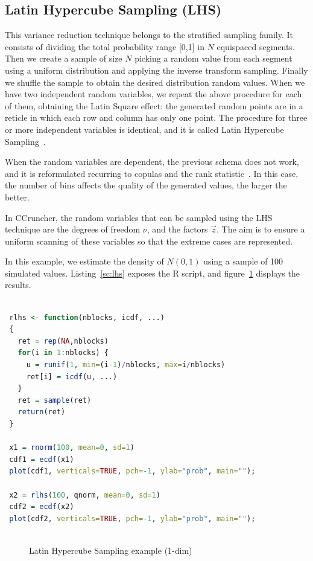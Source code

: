 \documentclass[11pt,fleqn]{book} %
\begin{document}
\subsection{Latin Hypercube Sampling (LHS)}
This variance reduction technique 
belongs to the stratified sampling family. It consists of dividing the total 
probability range [0,1] in $N$ equispaced segments. Then we create a 
sample of size $N$ picking a random value from each segment using a uniform 
distribution and applying the inverse transform sampling. Finally we shuffle 
the sample to obtain the desired distribution random values. When we have 
two independent random variables, we repeat the above procedure for each of 
them, obtaining the Latin Square effect: the generated random points are in
a reticle in which each row and column has only one point. The procedure for
three or more independent variables is identical, and it is called Latin 
Hypercube Sampling~\cite{glasserman:1997}.

When the random variables are dependent, the previous schema does not work, 
and it is reformulated recurring to copulas and the rank statistic~\cite{wolfgang:2008}. 
In this case, the number of bins affects the quality of the generated values, 
the larger the better.

In CCruncher, the random variables that can be sampled using the LHS 
technique are the degrees of freedom $\nu$, and the factors $\vec{z}$. 
The aim is to ensure a uniform scanning of these variables so that the
extreme cases are represented.

\begin{example}
	In this example, we estimate the density of $N(0,1)$ using a sample of 
	100 simulated values. Listing~\ref{sc:lhs} exposes the R script, and 
	figure~\ref{fig:lhs} displays the results.

	\begin{lstlisting}[language=R, label=sc:lhs, caption=Latin Hypercube Sampling example (R script)]

 rlhs <- function(nblocks, icdf, ...) 
 {
   ret = rep(NA,nblocks)
   for(i in 1:nblocks) {
     u = runif(1, min=(i-1)/nblocks, max=i/nblocks)
     ret[i] = icdf(u, ...)
   }
   ret = sample(ret)
   return(ret)
 }

 x1 = rnorm(100, mean=0, sd=1)
 cdf1 = ecdf(x1)
 plot(cdf1, verticals=TRUE, pch=-1, ylab="prob", main="");
 
 x2 = rlhs(100, qnorm, mean=0, sd=1)
 cdf2 = ecdf(x2)
 plot(cdf2, verticals=TRUE, pch=-1, ylab="prob", main="");
 
	\end{lstlisting}
	\begin{figure}[!ht]
		\centering
		\caption{Latin Hypercube Sampling example (1-dim)}
		\label{fig:lhs} 
	\end{figure}
\end{example}
\end{document}
